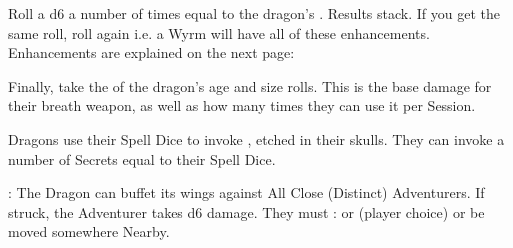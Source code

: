 \begin{multicols}{2}
Roll a d6 a number of times equal to the dragon's .  Results  stack. If you get the same roll, roll again i.e. a Wyrm will have all of these enhancements. Enhancements are explained on the next page:



Finally, take the \SUM of the dragon's age and size rolls.  This is the base damage for their breath weapon, as well as how many times they can use it per Session.

\newpage




\footnotesize \Asterisk Dragons use their Spell Dice to invoke , etched in their skulls. They can invoke a number of Secrets equal to their Spell Dice.
\normalsize



 :  The Dragon can buffet its wings against All Close (Distinct) Adventurers.  If struck, the Adventurer takes d6 damage.  They must \RS : \VIG or \DEX (player choice) or be moved somewhere Nearby.



\end{multicols}
